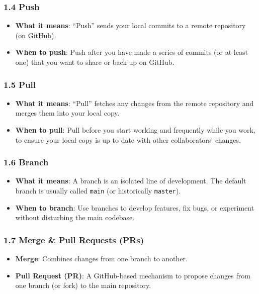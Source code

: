 \documentclass[
  letterpaper,
  DIV=11,
  numbers=noendperiod]{scrartcl}
\providecommand{\tightlist}{%
  \setlength{\itemsep}{0pt}\setlength{\parskip}{0pt}}\usepackage{longtable,booktabs,array}
\begin{document}
\subsubsection{1.4 Push}\label{push}

\begin{itemize}
\tightlist
\item
  \textbf{What it means}: ``Push'' sends your local commits to a remote
  repository (on GitHub).
\item
  \textbf{When to push}: Push after you have made a series of commits
  (or at least one) that you want to share or back up on GitHub.
\end{itemize}

\subsubsection{1.5 Pull}\label{pull}

\begin{itemize}
\tightlist
\item
  \textbf{What it means}: ``Pull'' fetches any changes from the remote
  repository and merges them into your local copy.
\item
  \textbf{When to pull}: Pull before you start working and frequently
  while you work, to ensure your local copy is up to date with other
  collaborators' changes.
\end{itemize}

\subsubsection{1.6 Branch}\label{branch}

\begin{itemize}
\tightlist
\item
  \textbf{What it means}: A branch is an isolated line of development.
  The default branch is usually called \texttt{main} (or historically
  \texttt{master}).
\item
  \textbf{When to branch}: Use branches to develop features, fix bugs,
  or experiment without disturbing the main codebase.
\end{itemize}

\subsubsection{1.7 Merge \& Pull Requests
(PRs)}\label{merge-pull-requests-prs}

\begin{itemize}
\tightlist
\item
  \textbf{Merge}: Combines changes from one branch to another.
\item
  \textbf{Pull Request (PR)}: A GitHub-based mechanism to propose
  changes from one branch (or fork) to the main repository.
\end{itemize}
\end{document}
